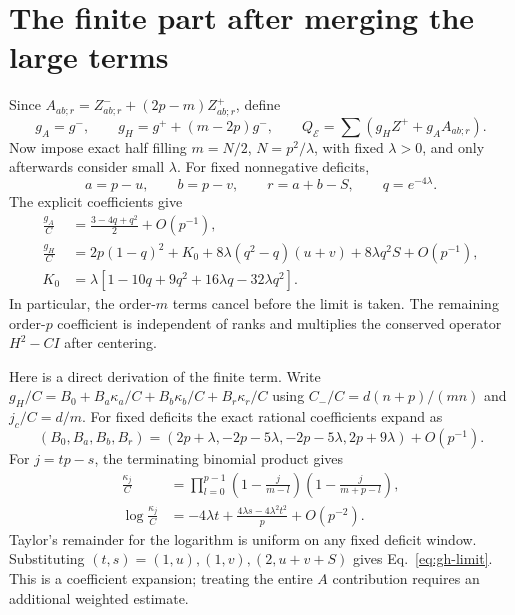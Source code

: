 \documentclass[11pt,a4paper]{article}
\newcommand{\core}{\mathcal E}
\begin{document}
\newpage
\section{The finite part after merging the large terms}
Since $A_{ab;r}=Z^-_{ab;r}+(2p-m)Z^+_{ab;r}$, define
\begin{equation}
 g_A=g^-,\qquad g_H=g^++(m-2p)g^-,\qquad
 Q_{\core}=\sum(g_HZ^++g_AA_{ab;r}).
\end{equation}
Now impose exact half filling $m=N/2$, $N=p^2/\lambda$, with fixed
$\lambda>0$, and only afterwards consider small $\lambda$.
For fixed nonnegative deficits,
\begin{equation}
 a=p-u,\qquad b=p-v,\qquad r=a+b-S,\qquad q=e^{-4\lambda}.
\end{equation}
The explicit coefficients give
\begin{align}
 \frac{g_A}{C}&=\frac{3-4q+q^2}{2}+O(p^{-1}),\label{eq:ga-limit}\\
 \frac{g_H}{C}&=2p(1-q)^2+K_0
     +8\lambda(q^2-q)(u+v)+8\lambda q^2S+O(p^{-1}),\label{eq:gh-limit}\\
 K_0&=\lambda\left[1-10q+9q^2+16\lambda q-32\lambda q^2\right].
\end{align}
In particular, the order-$m$ terms cancel before the limit is taken.
The remaining order-$p$ coefficient is independent of ranks and
multiplies the conserved operator $H^2-CI$ after centering.

Here is a direct derivation of the finite term. Write
$g_H/C=B_0+B_a\kappa_a/C+B_b\kappa_b/C+B_r\kappa_r/C$ using
$C_-/C=d(n+p)/(mn)$ and $j_c/C=d/m$. For fixed deficits the exact
rational coefficients expand as
\begin{equation}
 (B_0,B_a,B_b,B_r)
 =(2p+\lambda,-2p-5\lambda,-2p-5\lambda,2p+9\lambda)
       +O(p^{-1}).
\end{equation}
For $j=tp-s$, the terminating binomial product gives
\begin{align}
 \frac{\kappa_j}{C}
 &=\prod_{l=0}^{p-1}
       \left(1-\frac{j}{m-l}\right)
       \left(1-\frac{j}{m+p-l}\right),\\
 \log\frac{\kappa_j}{C}
 &=-4\lambda t+\frac{4\lambda s-4\lambda^2t^2}{p}
       +O(p^{-2}).
\end{align}
Taylor's remainder for the logarithm is uniform on any fixed deficit
window. Substituting $(t,s)=(1,u),(1,v),(2,u+v+S)$ gives
Eq.~\eqref{eq:gh-limit}. This is a coefficient expansion; treating
the entire $A$ contribution requires an additional weighted estimate.
\end{document}
